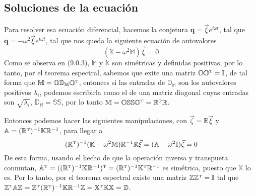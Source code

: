 \subsection{Soluciones de la ecuación}
Para resolver esa ecuación diferencial, hacemos la conjetura $\mathbf{q} = \vec{\xi} e^{i\omega t}$, tal que $\ddot{\mathbf{q}} = -\omega^2 \vec{\xi} e^{i\omega t}$, tal que nos queda la siguiente ecuación de autovalores
\begin{equation} \label{6.1.1}
    (\mathbb{K}-\omega^2 \mathbb{M})\vec{\xi} = 0
\end{equation}
Como se observa en (9.0.3), $\mathbb{M}$ y $\mathbb{K}$ son simétricas y definidas positivas, por lo tanto, por el teorema espectral, sabemos que exite una matriz $\mathbb{O} \mathbb{O}^{\mbox{\tiny T}} = \mathbb{I}$, de tal forma que $\mathbb{M} = \mathbb{O} \mathbb{D}_\mathbb{M} \mathbb{O}^{\mbox{\tiny T}}$, entonces si las entradas de $\mathbb{D}_\mathbb{M}$ son los autovalores positivos $\lambda_i$, podemos escribirla como el de una matriz diagonal cuyas entradas son $\sqrt{\lambda_i}$, $\mathbb{D}_\mathbb{M} = \mathbb{S} \mathbb{S}$, por lo tanto $\mathbb{M} = \mathbb{O} \mathbb{S} \mathbb{S} \mathbb{O}^{\mbox{\tiny T}} = \mathbb{R}^{\mbox{\tiny T}} \mathbb{R}$.

Entonces podemos hacer las siguientes manipulaciones, con $\vec{\zeta} = \mathbb{R}\vec{\xi}$ y $\mathbb{A} = (\mathbb{R}^{\mbox{\tiny T}})^{-1}\mathbb{K}\mathbb{R}^{-1}$, para llegar a 
\begin{equation} \label{6.1.1}
    (\mathbb{R}^{\mbox{\tiny T}})^{-1}(\mathbb{K}-\omega^2 \mathbb{M})\mathbb{R}^{-1} \mathbb{R}\vec{\xi} = (\mathbb{A}-\omega^2 \mathbb{I}) \vec{\zeta}= 0
\end{equation}
De esta forma, usando el hecho de que la operación inversa y transpueta conmutan, $\mathbb{A}^{\mbox{\tiny T}} = ((\mathbb{R}^{\mbox{\tiny T}})^{-1}\mathbb{K}\mathbb{R}^{-1})^{\mbox{\tiny T}}= (\mathbb{R}^{\mbox{\tiny T}})^{-1}\mathbb{K}^{\mbox{\tiny T}} \mathbb{R}^{-1}$ es simétrica, puesto que $\mathbb{K}$ lo es. Por lo tanto, por el teorema espectral existe una matriz $\mathbb{Z}\mathbb{Z}^{\mbox{\tiny T}} = \mathbb{I}$ tal que $\mathbb{Z}^{\mbox{\tiny T}} \mathbb{A} \mathbb{Z} = \mathbb{Z}^{\mbox{\tiny T}} (\mathbb{R}^{\mbox{\tiny T}})^{-1}\mathbb{K}\mathbb{R}^{-1} \mathbb{Z}=\mathbb{X}^{\mbox{\tiny T}} \mathbb{K} \mathbb{X} = \mathbb{D}$.

